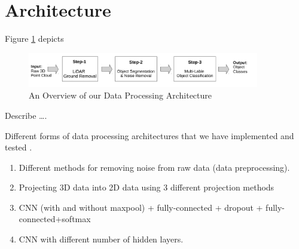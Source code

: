 \section{Architecture}\label{sec:Architecture}








Figure \ref{fig:dataPipeline} depicts  

\begin{figure}[h!]
 \begin{center}
   \includegraphics[width=0.9\textwidth]{./images/DataProcessingPipleline.pdf}
   \caption{An Overview of our Data Processing Architecture}
   \label{fig:dataPipeline}
 \end{center}
\end{figure}





Describe \ldots. 

Different forms of data processing architectures that we have implemented and tested . 

\begin{enumerate}
  \item Different methods for removing noise from raw data (data preprocessing). 
  \item Projecting 3D data into 2D data using 3 different projection methods 
  \item CNN  (with and without maxpool) + fully-connected + dropout + fully-connected+softmax
  \item CNN with different number of hidden layers. 

\end{enumerate}






